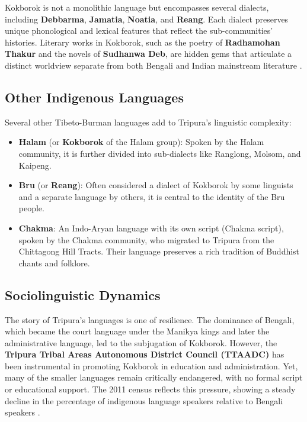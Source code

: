 \documentclass{article}
\begin{document}
Kokborok is not a monolithic language but encompasses several dialects, including \textbf{Debbarma}, \textbf{Jamatia}, \textbf{Noatia}, and \textbf{Reang}. Each dialect preserves unique phonological and lexical features that reflect the sub-communities' histories. Literary works in Kokborok, such as the poetry of \textbf{Radhamohan Thakur} and the novels of \textbf{Sudhanwa Deb}, are hidden gems that articulate a distinct worldview separate from both Bengali and Indian mainstream literature \cite{deb2005}.

\subsection{Other Indigenous Languages}
Several other Tibeto-Burman languages add to Tripura's linguistic complexity:
\begin{itemize}
    \item \textbf{Halam} (or \textbf{Kokborok} of the Halam group): Spoken by the Halam community, it is further divided into sub-dialects like Ranglong, Molsom, and Kaipeng.
    \item \textbf{Bru} (or \textbf{Reang}): Often considered a dialect of Kokborok by some linguists and a separate language by others, it is central to the identity of the Bru people.
    \item \textbf{Chakma}: An Indo-Aryan language with its own script (Chakma script), spoken by the Chakma community, who migrated to Tripura from the Chittagong Hill Tracts. Their language preserves a rich tradition of Buddhist chants and folklore.
\end{itemize}

\subsection{Sociolinguistic Dynamics}
The story of Tripura's languages is one of resilience. The dominance of Bengali, which became the court language under the Manikya kings and later the administrative language, led to the subjugation of Kokborok. However, the \textbf{Tripura Tribal Areas Autonomous District Council (TTAADC)} has been instrumental in promoting Kokborok in education and administration. Yet, many of the smaller languages remain critically endangered, with no formal script or educational support. The 2011 census reflects this pressure, showing a steady decline in the percentage of indigenous language speakers relative to Bengali speakers \cite{census2011}.
\end{document}
